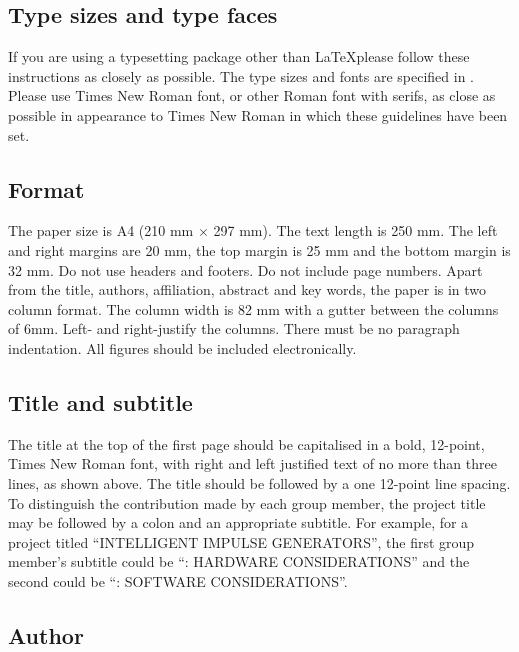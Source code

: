 \documentclass[10pt,twocolumn]{witseiepaper}
\begin{document}
\subsection{Type sizes and type faces}

If you are using a typesetting package other than \LaTeX please follow these
instructions as closely as possible. The type sizes and fonts are specified in
.  Please use Times New Roman font, or other Roman font with
serifs, as close as possible in appearance to Times New Roman in which these
guidelines have been set.

\subsection{Format}

The paper size is A4 (210 mm $\times$ 297 mm). The text length is 250 mm. The
left and right margins are 20 mm, the top margin is 25 mm and the bottom margin
is 32 mm. Do not use headers and footers. Do not include page numbers.  Apart
from the title, authors, affiliation, abstract and key words, the paper is in
two column format. The column width is 82 mm with a gutter between the columns
of 6mm. Left- and right-justify the columns. There must be no paragraph
indentation. All figures should be included electronically.

\subsection{Title and subtitle}

The title at the top of the first page should be capitalised in a bold,
12-point, Times New Roman font, with right and left justified text of no more
than three lines, as shown above. The title should be followed by a one
12-point line spacing.  To distinguish the contribution made by each group
member, the project title may be followed by a colon and an appropriate
subtitle. For example, for a project titled ``INTELLIGENT IMPULSE
GENERATORS'', the first group member's subtitle could be ``: HARDWARE
CONSIDERATIONS'' and the second could be ``: SOFTWARE CONSIDERATIONS''.

\subsection{Author}
\end{document}
